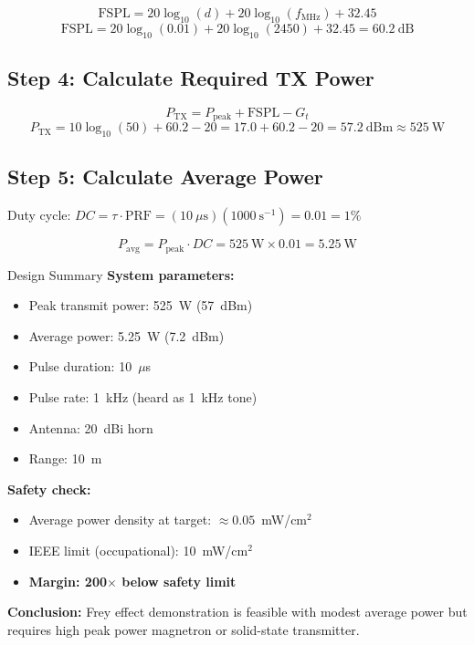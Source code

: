 \begin{equation}
\text{FSPL} = 20\log_{10}(d) + 20\log_{10}(f_{\text{MHz}}) + 32.45
\end{equation}
\begin{equation}
\text{FSPL} = 20\log_{10}(0.01) + 20\log_{10}(2450) + 32.45 = 60.2~\text{dB}
\end{equation}

\subsection*{Step 4: Calculate Required TX Power}

\begin{equation}
P_{\text{TX}} = P_{\text{peak}} + \text{FSPL} - G_t
\end{equation}
\begin{equation}
P_{\text{TX}} = 10\log_{10}(50) + 60.2 - 20 = 17.0 + 60.2 - 20 = 57.2~\text{dBm} \approx 525~\text{W}
\end{equation}

\subsection*{Step 5: Calculate Average Power}

Duty cycle: $DC = \tau \cdot \text{PRF} = (10~\mu\text{s})(1000~\text{s}^{-1}) = 0.01 = 1\%$

\begin{equation}
P_{\text{avg}} = P_{\text{peak}} \cdot DC = 525~\text{W} \times 0.01 = 5.25~\text{W}
\end{equation}

\begin{calloutbox}[colback=black!5!white,colframe=black]{Design Summary}
\textbf{System parameters:}
\begin{itemize}
\item Peak transmit power: 525~W (57~dBm)
\item Average power: 5.25~W (7.2~dBm)
\item Pulse duration: 10~$\mu$s
\item Pulse rate: 1~kHz (heard as 1~kHz tone)
\item Antenna: 20~dBi horn
\item Range: 10~m
\end{itemize}

\textbf{Safety check:}
\begin{itemize}
\item Average power density at target: $\approx 0.05$~mW/cm$^2$
\item IEEE limit (occupational): 10~mW/cm$^2$
\item \textbf{Margin: 200$\times$ below safety limit}
\end{itemize}

\textbf{Conclusion:} Frey effect demonstration is feasible with modest average power but requires high peak power magnetron or solid-state transmitter.
\end{calloutbox}

